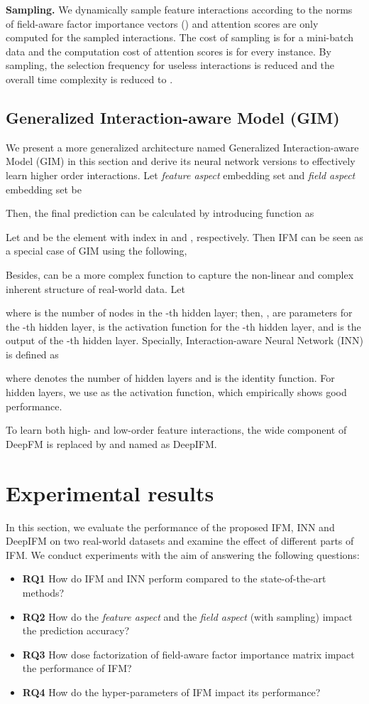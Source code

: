 \documentclass[letterpaper]{article} \usepackage{aaai19}  \usepackage{times}  \usepackage{helvet}  \usepackage{courier}  \usepackage{url}  \usepackage{graphicx}  \frenchspacing  \setlength{\pdfpagewidth}{8.5in}  \setlength{\pdfpageheight}{11in}  \usepackage{mathtools}
\begin{document}
\textbf{Sampling.} We dynamically sample  feature interactions according to the norms of field-aware factor importance vectors () and attention scores are only computed for the sampled interactions. The cost of sampling is  for a mini-batch data and the computation cost of attention scores is  for every instance. By sampling, the selection frequency for useless interactions is reduced and the overall time complexity is reduced to . 


\subsection{Generalized Interaction-aware Model (GIM)}
We present a more generalized architecture named Generalized Interaction-aware Model (GIM) in this section and derive its neural network versions to effectively learn higher order interactions. Let \emph{feature aspect} embedding set   and \emph{field aspect} embedding set  be


Then, the final prediction can be calculated by introducing function  as

Let  and  be the element with index  in  and , respectively. Then IFM can be seen as a special case of GIM using the following, 

Besides,  can be a more complex function to capture the non-linear and complex inherent structure of real-world data. Let

where  is the number of nodes in the -th hidden layer; then, ,  are parameters for the -th hidden layer,  is the activation function for the -th hidden layer, and  is the output of the -th hidden layer. Specially, Interaction-aware Neural Network (INN) is defined as

where  denotes the number of hidden layers and  is the identity function. For hidden layers, we use  as the activation function, which empirically shows good performance.

To learn both high- and low-order feature interactions, the wide component
of DeepFM\cite{guo2017deepfm} is replaced by  and named as DeepIFM. 

 
\section{Experimental results}
In this section, we evaluate the performance of the proposed IFM, INN and DeepIFM on two real-world datasets and examine the effect of different parts of IFM. We conduct experiments with the aim of answering the following questions:
\begin{itemize}
\item \textbf{RQ1} How do IFM and INN perform compared to the state-of-the-art methods?
\item \textbf{RQ2} How do the \emph{feature aspect} and the \emph{field aspect} (with sampling) impact the prediction accuracy?
\item \textbf{RQ3} How dose factorization of field-aware factor importance matrix  impact the performance of IFM?
\item \textbf{RQ4} How do the hyper-parameters of IFM impact its performance?

\end{itemize} 
\end{document}
